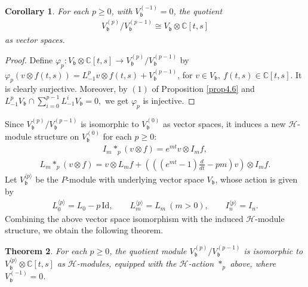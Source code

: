 \documentclass[a4paper]{amsart}
\numberwithin{equation}{section}
\newtheorem{theorem}{Theorem}[section]
\newtheorem{corollary}[theorem]{Corollary}
\begin{document}
\begin{corollary}
For each $p\geq 0$, with $V_{\mathfrak b}^{(-1)}=0$, the quotient
\begin{align*}
V_{\mathfrak{b}}^{(p)}/V_{\mathfrak b}^{(p-1)}
\cong
V_{\mathfrak{b}}\otimes \mathbb C[t,s]
\end{align*}
as vector spaces.
\end{corollary}
\begin{proof}
Define
$
\varphi_p:V_{\mathfrak{b}}\otimes \mathbb C[t,s]\longrightarrow V_{\mathfrak{b}}^{(p)}/V_{\mathfrak{b}}^{(p-1)}
$ by
$
\varphi_p(v\otimes f(t,s))
=
L_{-1}^pv\otimes f(t,s)+V_{\mathfrak{b}}^{(p-1)}$,
for $v\in V_{\mathfrak{b}},\ f(t,s)\in\mathbb C[t,s]$.
It is clearly surjective. Moreover, by $(1)$ of Proposition \ref{prop4.6} and 
$L_{-1}^pV_{\mathfrak{b}}\cap \sum_{i=0}^{p-1}L_{-1}^iV_{\mathfrak{b}}=0,
$
we get $\varphi_p$ is injective.
\end{proof}
Since $V_{\mathfrak{b}}^{(p)}/V_{\mathfrak{b}}^{(p-1)}$ is isomorphic to $V_{\mathfrak{b}}^{(0)}$ as vector spaces, it induces a new $\mathcal H$-module structure on $V_{\mathfrak{b}}^{(0)}$ for each $p\geq 0$:
\begin{align*}
I_m\ast_p(v\otimes f)=e^{mt}v\otimes I_mf,
\end{align*}
\begin{align*}
L_m\ast_p(v\otimes f)
=
v\otimes L_mf+
\left(\left((e^{mt}-1)\frac{d}{dt}-pm\right)v\right)\otimes I_mf.
\end{align*}
Let $V_{\mathfrak b}^{\langle p\rangle}$ be the $P$-module with underlying vector space $V_{\mathfrak b}$, whose action is given by
\begin{align*}
L_0^{\langle p\rangle}=L_0-p\,\mathrm{Id},\qquad
L_m^{\langle p\rangle}=L_m\ (m>0),\qquad
I_n^{\langle p\rangle}=I_n.
\end{align*}
Combining the above vector space isomorphism with the induced $\mathcal{H}$-module structure, we obtain the following theorem.
\begin{theorem}
    For each $p\geq 0$, the quotient module $V_{\mathfrak b}^{(p)}/V_{\mathfrak b}^{(p-1)}$ is isomorphic to $V_{\mathfrak b}^{\langle p\rangle}\otimes\mathbb C[t,s]$ as $\mathcal{H}$-modules, equipped with the $\mathcal H$-action $\ast_p$ above, where $V_{\mathfrak{b}}^{(-1)}=0$.
\end{theorem}
\end{document}

